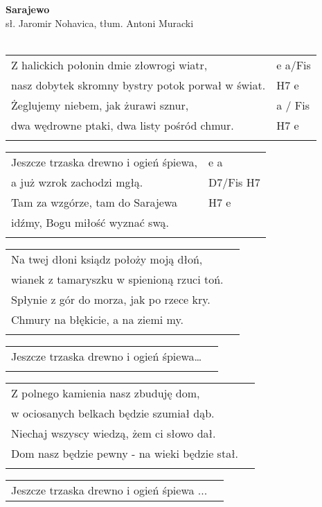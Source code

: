\documentclass[a5paper]{article}
\begin{document}


\noindent
\fontsize{12pt}{15pt}\selectfont
\textbf{Sarajewo} \\
\fontsize{8pt}{10pt}\selectfont
sł. Jaromir Nohavica, tłum. Antoni Muracki \\ \\
\fontsize{10pt}{12pt}\selectfont
{}
\begin{tabular}{@{}p{8.50cm}p{3cm}@{}}
\noindent
Z halickich połonin dmie złowrogi wiatr, & e a/Fis \\
nasz dobytek skromny bystry potok porwał w świat.& H7 e \\
Żeglujemy niebem, jak żurawi sznur, & a / Fis \\
dwa wędrowne ptaki, dwa listy pośród chmur. & H7 e \\ \\
\end{tabular}

\noindent
\begin{tabular}{@{}p{7.50cm}p{3cm}@{}}
Jeszcze trzaska drewno i ogień śpiewa, & e a \\
a już wzrok zachodzi mgłą. & D7/Fis H7 \\
Tam za wzgórze, tam do Sarajewa & H7 e \\ 
idźmy, Bogu miłość wyznać swą. \\ \\
\end{tabular}

\noindent
\begin{tabular}{@{}p{7.50cm}p{3cm}@{}}
Na twej dłoni ksiądz położy moją dłoń,\\
wianek z tamaryszku w spienioną rzuci toń.\\
Spłynie z gór do morza, jak po rzece kry.\\
Chmury na błękicie, a na ziemi my.\\ \\
\end{tabular}

\noindent
\begin{tabular}{@{}p{7.50cm}p{3cm}@{}}
Jeszcze trzaska drewno i ogień śpiewa… \\ \\
\end{tabular}

\noindent
\begin{tabular}{@{}p{7.50cm}p{3cm}@{}}
Z polnego kamienia nasz zbuduję dom,\\
w ociosanych belkach będzie szumiał dąb.\\
Niechaj wszyscy wiedzą, żem ci słowo dał.\\
Dom nasz będzie pewny - na wieki będzie stał.\\\\
\end{tabular}

\noindent
\begin{tabular}{@{}p{7.50cm}p{3cm}@{}}
Jeszcze trzaska drewno i ogień śpiewa ...
\end{tabular}
\end{document}
